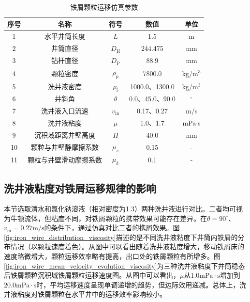 \begin{table}[htbp]
    \centering
    \caption{铁屑颗粒运移仿真参数}
    \label{tab:simulation_params}
    \begin{tabularx}{.9\textwidth}{CCCCC} 
        \toprule %
        序号 & 名称 & 符号 & 数值 & 单位 \\ 
        \midrule %

        
        1 & 水平井筒长度 & $L$ & 1.5 & m \\
        2 & 井筒直径 & $D_\mathrm{H}$ & 244.475 & mm \\
        3 & 钻杆直径 & $D_\mathrm{P}$ & 88.9 & mm \\
        4 & 颗粒密度 & $\rho_\mathrm{p}$ & 7800.0 & kg/m$^3$ \\
        5 & 洗井液密度 & $\rho_\mathrm{l}$ & 1000.0、1300.0 & kg/m$^3$ \\
        6 & 井斜角 & $\theta$ & 0.0、45.0、90.0 & $^\circ$ \\
        7 & 洗井液入口流速 & $v_{\mathrm{in}}$ & 0.17、0.27 & m/s \\
        8 & 洗井液粘度 & $\mu$ & 1.0、1.7 & mPa$\cdot$s \\
        9 & 沉积域距离井壁高度 & $H$ & 40.0 & mm \\
        10 & 颗粒与井壁静摩擦系数 & $\mu_s$ & 0.15 & - \\
        11 & 颗粒与井壁滑动摩擦系数 & $\mu_k$ & 0.1 & - \\
        
        \bottomrule %
    \end{tabularx}
\end{table}

\subsection{洗井液粘度对铁屑运移规律的影响}
本节选取清水和氯化钠溶液（相对密度为1.3）两种洗井液进行对比。二者均可视为牛顿流体，但粘度不同，对铁屑颗粒的携带效果可能存在差异。在$\theta=90^\circ$、$v_{\mathrm{in}}=0.27\mathrm{m/s}$的条件下，通过仿真对比二者的携屑效果。图\ref{fig:iron_wire_distribution_viscosity}描述的是不同洗井液粘度下井筒内铁屑的分布情况（以颗粒速度着色）。从图中可以看出随着洗井液粘度增大，移动铁屑床的速度略微增大，颗粒运移效率略有提高，出口处的铁屑颗粒有所增多。图\ref{fig:iron_wire_mean_velocity_evolution_viscosity}为三种洗井液粘度下井筒稳态后铁屑颗粒沉积域铁屑颗粒运移速度图。从图中可以看出，$\mu$从$1.0\mathrm{mPa\cdot s}$增加到$20.0\mathrm{mPa\cdot s}$时，平均运移速度呈现单调递增的趋势，但边际效用递减。总体上，洗井液粘度对铁屑颗粒在水平井中的运移效率影响较小。

